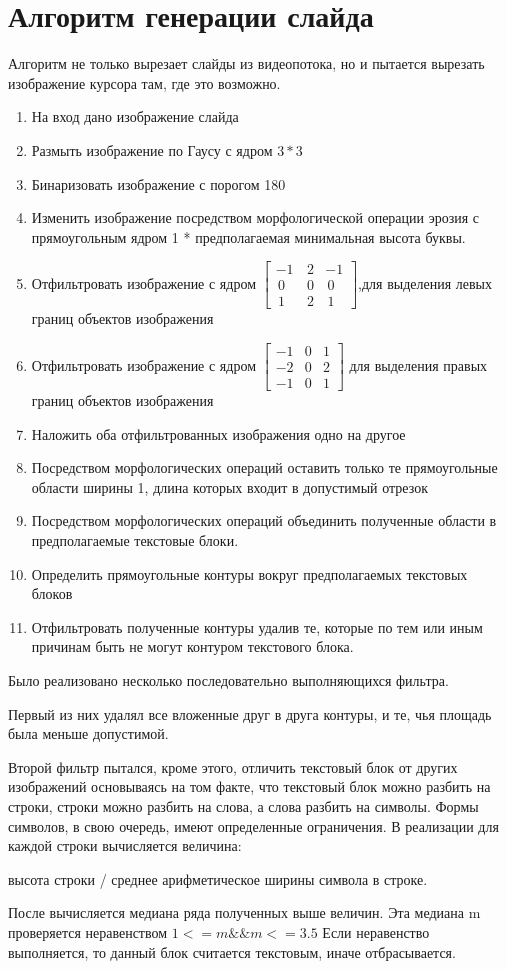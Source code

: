 \documentclass[oneside,final,14pt]{extreport}
\begin{document}
\section{Алгоритм генерации слайда}
Алгоритм не только вырезает слайды из видеопотока, но и пытается вырезать изображение курсора там, где это возможно.
\begin{enumerate}
\item На вход дано изображение слайда
\item Размыть изображение по Гаусу с ядром $3*3$
\item Бинаризовать изображение с порогом 180
\item Изменить изображение посредством морфологической операции эрозия с прямоугольным ядром 1 * предполагаемая минимальная высота буквы. 
\item Отфильтровать изображение с ядром  
$\begin{bmatrix}
 -1 & \,2 & -1 \\
\,0 & \,0 &\,0 \\
\,1 & \,2 &\,1
\end{bmatrix}$,для выделения левых границ объектов изображения
\item Отфильтровать изображение с ядром 
$\begin{bmatrix}
-1 & 0 &  1 \\
-2 & 0 &  2 \\
-1 & 0 &  1
\end{bmatrix}$ для выделения правых границ объектов изображения
\item Наложить оба отфильтрованных изображения одно на другое 
\item Посредством морфологических операций оставить только те прямоугольные области ширины 1, длина которых  входит в допустимый отрезок
\item Посредством морфологических операций объединить полученные области в предполагаемые текстовые блоки.
\item Определить прямоугольные контуры вокруг предполагаемых текстовых блоков
\item Отфильтровать полученные контуры удалив те, которые по тем или иным причинам быть не могут контуром текстового блока.
\end{enumerate}

Было реализовано несколько последовательно выполняющихся фильтра.

Первый из них удалял все вложенные друг в друга контуры, и те, чья площадь была меньше допустимой.

Второй фильтр пытался, кроме этого, отличить текстовый блок от других изображений основываясь на том факте, что текстовый блок можно разбить на строки, строки можно разбить на слова, а слова разбить на символы. Формы символов, в свою очередь, имеют определенные ограничения. В реализации для каждой строки вычисляется величина:
\begin{center}
высота строки / среднее арифметическое ширины символа в строке.
\end{center}
После вычисляется медиана ряда полученных выше величин. Эта медиана m проверяется неравенством
$1 <= m \&\& m <= 3.5$
Если неравенство выполняется, то данный блок считается текстовым, иначе отбрасывается. 
\end{document}
